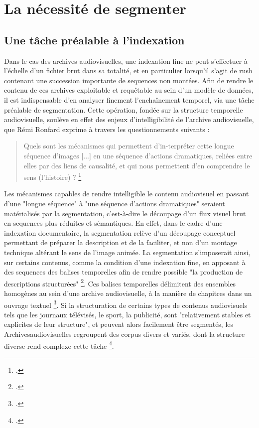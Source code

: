 \section{\label{I_3_B}La nécessité de segmenter} 

\subsection{Une tâche préalable à l'indexation}
Dans le cas des archives audiovisuelles, une indexation fine ne peut s’effectuer à l’échelle d'un fichier brut dans sa totalité, et en particulier lorsqu’il s’agit de \gls{rush} contenant une succession importante de \gls{sequence}s non montées. Afin de rendre le contenu de ces archives exploitable et requêtable au sein d’un modèle de données, il est indispensable d’en analyser finement l'enchaînement temporel, via une tâche préalable de segmentation. Cette opération, fondée sur la structure temporelle audiovisuelle, soulève en effet des enjeux d'intelligibilité de l'archive audiovisuelle, que Rémi Ronfard exprime à travers les questionnements suivants :  

\begin{quote} 
	
	Quels sont les mécanismes qui permettent d’in-terpréter cette longue séquence d’images [...] en une séquence d’actions dramatiques, reliées entre elles par des liens de causalité, et qui nous permettent d’en comprendre le sens (l’histoire) ? \footcite{zotero-item-644} 
	
\end{quote} 

Les mécanismes capables de rendre intelligible le contenu audiovisuel en passant d'une "longue séquence" à "une séquence d'actions dramatiques" seraient matérialisés par la segmentation, c'est-à-dire le découpage d'un flux visuel brut en \gls{sequence}s plus réduites et sémantiques. En effet, dans le cadre d'une indexation documentaire, la segmentation relève d'un découpage conceptuel permettant de préparer la description et de la faciliter, et non d'un montage technique altérant le sens de l’image animée. La segmentation s'imposerait ainsi, sur certains contenus, comme la condition d'une indexation fine, en apposant à des \gls{sequence}s des balises temporelles afin de rendre possible "la production de descriptions structurées" \footcite{stockinger2011}. Ces balises temporelles délimitent des ensembles homogènes au sein d'une archive audiovisuelle, à la manière de chapitres dans un ouvrage textuel \footcite{stockinger2011}. Si la structuration de certains types de contenus audiovisuels tels que les journaux télévisés, le sport, la publicité, sont "relativement stables et explicites de leur structure", et peuvent alors facilement être segmentés, les \gls{Archivesaudiovisuelles} regroupent des corpus divers et variés, dont la structure diverse rend complexe cette tâche \footcite{carrive2014}.

